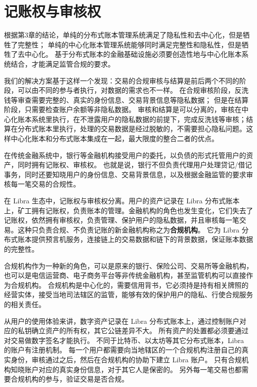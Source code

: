 \section{记账权与审核权}\label{sec:arrangement}
根据第3章的结论，单纯的分布式账本管理系统满足了隐私性和去中心化，但是牺牲了完整性；
单纯的中心化账本管理系统能够同时满足完整性和隐私性，但是牺牲了去中心化。
基于分布式账本的金融基础设施必须要创造性地与中心化账本系统结合，才能满足监管合规的要求。

我们的解决方案基于这样一个发现：交易的合规审核与结算是前后两个不同的阶段，可以由不同的参与者执行，对数据的需求也不一样。
在合规审核阶段，反洗钱等审查需要完整的、真实的身份信息、交易背景信息等隐私数据；
但是在结算阶段，只需要检查账户余额等非隐私数据。
审核和结算是可以分离的，审核在中心化账本系统里执行，在不泄露用户的隐私数据的前提下，完成反洗钱等审核；结算在分布式账本里执行，处理的交易数据是经过脱敏的，不需要担心隐私问题。这样中心化账本和分布式账本集成在一起，最大限度的整合二者的优点。


在传统金融系统中，银行等金融机构接受用户的委托，以负债的形式托管用户的资产，同时拥有记账权、审核权。
也就是说，银行不但负责代理用户处理贷记/借记事务，同时还要知晓用户的身份信息、交易背景信息，以及根据金融监管的要求审核每一笔交易的合规性。

在 Libra 生态中，记账权与审核权分离。用户的资产记录在 Libra 分布式账本上，矿工拥有记账权，负责账本的管理。金融机构的角色也发生变化，它们失去了记账权，依然拥有审核权，负责管理、保护用户的隐私数据，并且审核每一笔交易。这种只负责合规、不负责记账的新金融机构称之为\textbf{合规机构}。
它为 Libra 分布式账本提供预言机服务，连接链上的交易数据和链下的背景数据，保证账本数据的完整性。

合规机构作为一种新的角色，可以是原来的银行、保险公司、交易所等金融机构，也可以是电信运营商、电子商务平台等非传统金融机构，甚至监管机构可以直接作为合规机构。
合规机构是中心化的，需要信用背书，它必须持是持有相关牌照的经营实体，接受当地司法辖区的监管，能够有效的保护用户的隐私、行使合规服务的相关责任。

从用户的使用体验来讲，数字资产记录在 Libra 分布式账本上，通过控制账户对应的私钥确立资产的所有权，其它公链差异不大。
所有资产的处置都必须要通过对交易做数字签名才能执行。
不同于比特币、以太坊等其它分布式账本，Libra 的账户有注册机制。
每一个用户都需要向当地辖区的一个合规机构注册自己的真实身份，审核通过之后，然后在合规机构的协助下建立 Libra 账户。
只有合规机构知晓账户对应的真实身份信息，对于其它人是保密的。
另外每一笔交易也都需要合规机构的参与，验证交易是否合规。

